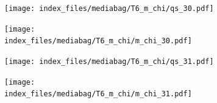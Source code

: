 \documentclass[
  11pt,
  letterpaper,
]{scrreprt}
\begin{document}
\begin{figure}

\begin{minipage}{0.50\linewidth}

\begin{figure}[H]

{\centering \texttt{[image: index\_files/mediabag/T6\_m\_chi/qs\_30.pdf]}

}


\end{figure}%

\end{minipage}%
%
\begin{minipage}{0.50\linewidth}

\begin{figure}[H]

{\centering \texttt{[image: index\_files/mediabag/T6\_m\_chi/m\_chi\_30.pdf]}

}


\end{figure}%

\end{minipage}%

\end{figure}%

\begin{figure}

\begin{minipage}{0.50\linewidth}

\begin{figure}[H]

{\centering \texttt{[image: index\_files/mediabag/T6\_m\_chi/qs\_31.pdf]}

}


\end{figure}%

\end{minipage}%
%
\begin{minipage}{0.50\linewidth}

\begin{figure}[H]

{\centering \texttt{[image: index\_files/mediabag/T6\_m\_chi/m\_chi\_31.pdf]}

}


\end{figure}%

\end{minipage}%

\end{figure}%
\end{document}
